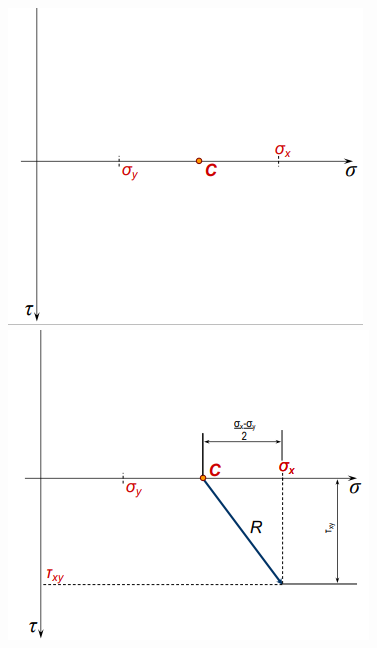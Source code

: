 \documentclass[class=report, crop=false, 12pt,a4paper]{standalone}
\begin{document}
\begin{figure}[H]
    \begin{minipage}{0.25\textwidth}
        \centering
        \includegraphics[width=\textwidth]{../img/diagram53.png}   
    \end{minipage}
    \begin{minipage}{0.25\textwidth}
        \centering
        \includegraphics[width=\textwidth]{../img/diagram54.png}   
    \end{minipage}

\end{figure}
\end{document}
